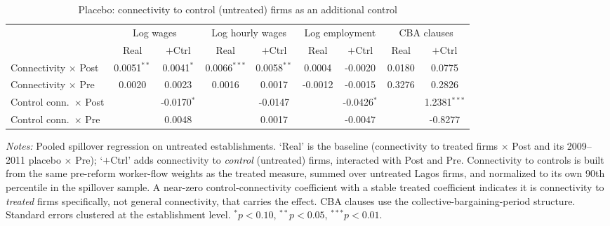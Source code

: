 \begin{table}[H]\centering\scriptsize
\caption{Placebo: connectivity to control (untreated) firms as an additional control}
\label{tab:placebo_control}
\begin{tabular}{l cccccccc}
\toprule
 & \multicolumn{2}{c}{Log wages} & \multicolumn{2}{c}{Log hourly wages} & \multicolumn{2}{c}{Log employment} & \multicolumn{2}{c}{CBA clauses} \\
\cmidrule(lr){2-3}\cmidrule(lr){4-5}\cmidrule(lr){6-7}\cmidrule(lr){8-9}
 & Real & $+$Ctrl & Real & $+$Ctrl & Real & $+$Ctrl & Real & $+$Ctrl \\
\midrule
Connectivity $\times$ Post & 0.0051$^{**}$ & 0.0041$^{*}$ & 0.0066$^{***}$ & 0.0058$^{**}$ & 0.0004 & -0.0020 & 0.0180 & 0.0775 \\
Connectivity $\times$ Pre & 0.0020 & 0.0023 & 0.0016 & 0.0017 & -0.0012 & -0.0015 & 0.3276 & 0.2826 \\
Control conn.\ $\times$ Post &  & -0.0170$^{*}$ &  & -0.0147 &  & -0.0426$^{*}$ &  & 1.2381$^{***}$ \\
Control conn.\ $\times$ Pre &  & 0.0048 &  & 0.0017 &  & -0.0047 &  & -0.8277 \\
\bottomrule
\end{tabular}
\begin{minipage}{\textwidth}\vspace{4pt}\scriptsize \textit{Notes:} Pooled spillover regression on untreated establishments. `Real' is the baseline (connectivity to treated firms $\times$ Post and its 2009--2011 placebo $\times$ Pre); `$+$Ctrl' adds connectivity to \emph{control} (untreated) firms, interacted with Post and Pre. Connectivity to controls is built from the same pre-reform worker-flow weights as the treated measure, summed over untreated Lagos firms, and normalized to its own 90th percentile in the spillover sample. A near-zero control-connectivity coefficient with a stable treated coefficient indicates it is connectivity to \emph{treated} firms specifically, not general connectivity, that carries the effect. CBA clauses use the collective-bargaining-period structure. Standard errors clustered at the establishment level. $^{*}p<0.10$, $^{**}p<0.05$, $^{***}p<0.01$.\end{minipage}
\end{table}